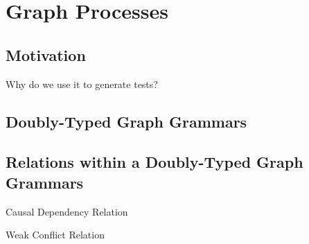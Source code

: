 \chapter{Graph Processes}

\section{Motivation}

Why do we use it to generate tests?

\section{Doubly-Typed Graph Grammars}

\begin{definition}
\end{definition}

\begin{definition}
\end{definition}

\begin{definition}
\end{definition}

\begin{definition}
\end{definition}

\section{Relations within a Doubly-Typed Graph Grammars}
\begin{definition}{Causal Dependency Relation}
\end{definition}

\begin{definition}{Weak Conflict Relation}
\end{definition}
